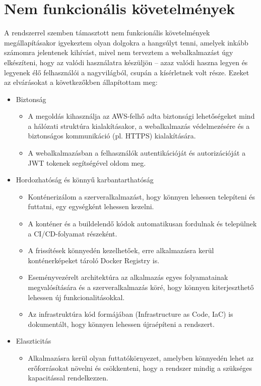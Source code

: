 \section{Nem funkcionális követelmények}

A rendszerrel szemben támasztott nem funkcionális követelmények megállapításakor igyekeztem olyan dolgokra a hangsúlyt tenni, amelyek inkább számomra jelentenek kihívást, mivel nem terveztem a webalkalmazást úgy elkészíteni, hogy az valódi használatra készüljön -- azaz valódi haszna legyen és legyenek élő felhasználói a nagyvilágból, csupán a kísérletnek volt része. Ezeket az elvárásokat a következőkben állapítottam meg:

\begin{itemize}
  \item Biztonság
  \begin{itemize}
    \item A megoldás kihasználja az AWS-felhő adta biztonsági lehetőségeket mind a hálózati struktúra kialakításakor, a webalkalmazás védelmezésére és a biztonságos kommunikáció (pl. HTTPS) kialakítására.
    \item A webalkalmazásban a felhasználók autentikációját és autorizációját a JWT tokenek segítségével oldom meg.
  \end{itemize}
  \item Hordozhatóság és könnyű karbantarthatóság
   \begin{itemize}
    \item Konténerizálom a szerveralkalmazást, hogy könnyen lehessen telepíteni és futtatni, egy egységként lehessen kezelni.
    \item A konténer és a buildelendő kódok automatikusan fordulnak és települnek a CI/CD-folyamat részeként.
    \item A frissítések könnyedén kezelhetőek, erre alkalmazásra kerül konténerképeket tároló Docker Registry is.
    \item Eseményvezérelt architektúra az alkalmazás egyes folyamatainak megvalósítására és a szerveralkalmazás köré, hogy könnyen kiterjeszthető lehessen új funkcionalitásokkal.
    \item Az infrastruktúra kód formájában (Infrastructure as Code, IaC) is dokumentált, hogy könnyen lehessen újraépíteni a rendszert.
  \end{itemize}
  \item Elaszticitás
  \begin{itemize}
    \item Alkalmazásra kerül olyan futtatókörnyezet, amelyben könnyedén lehet az erőforrásokat növelni és csökkenteni, hogy a rendszer mindig a szükséges kapacitással rendelkezzen.

\end{itemize}
\end{itemize}

